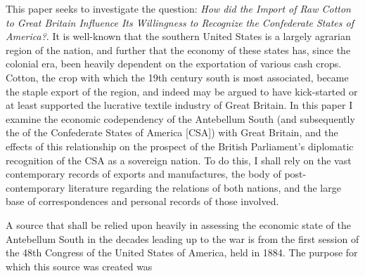 \documentclass[../HistoryIA.tex]{subfiles}
\begin{document}
This paper seeks to investigate the question: \flq{} \textit{How did the Import of Raw Cotton to Great Britain Influence Its Willingness to Recognize the
Confederate States of America?}\frq{}. It is well-known that the southern United States is a largely agrarian region of the nation, and further that the 
economy of these states has, since the colonial era, been heavily dependent on the exportation of various \flq{}cash crops\frq{}. Cotton, the crop with which 
the 19th century south is most associated, became the staple export of the region, and indeed may be argued to have kick-started or at least supported the 
lucrative textile industry of Great Britain. In this paper I examine the economic codependency of the Antebellum South (and subsequently the of the 
Confederate States of America [CSA]) with Great Britain, and the effects of this relationship on the prospect of the British Parliament's diplomatic 
recognition of the CSA as a sovereign nation. To do this, I shall rely on the vast contemporary records of exports and manufactures, the body of post-
contemporary literature regarding the relations of both nations, and the large base of correspondences and personal records of those involved.

A source that shall be relied upon heavily in assessing the economic state of the Antebellum South in the decades leading up to the war is 
 from the first session of the 48th Congress of the United States of America, held in 1884. The purpose for 
which this source was created was 
\end{document}

